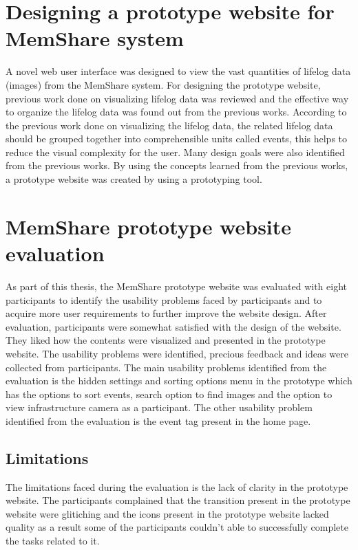 \documentclass[mscthesis]{usiinfthesis}
\begin{document}
\section{Designing a prototype website for MemShare system}
A novel web user interface was designed to view the vast quantities of lifelog data (images) from the MemShare system. For designing the prototype website, previous work done on visualizing lifelog data was reviewed and the effective way to organize the lifelog data was found out from the previous works. According to the previous work done on visualizing the lifelog data, the related lifelog data should be grouped together into comprehensible units called events, this helps to reduce the visual complexity for the user. Many design goals were also identified from the previous works. By using the concepts learned from the previous works, a prototype website was created by using a prototyping tool. 

\section{MemShare prototype website evaluation}
As part of this thesis, the MemShare prototype website was evaluated with eight participants to identify the usability problems faced by participants and to acquire more user requirements to further improve the website design. After evaluation, participants were somewhat satisfied with the design of the website. They liked how the contents were visualized and presented in the prototype website. The usability problems were identified, precious feedback and ideas were collected from participants. The main usability problems identified from the evaluation is the hidden settings and sorting options menu in the prototype which has the options to sort events, search option to find images and the option to view infrastructure camera as a participant. The other usability problem identified from the evaluation is the event tag present in the home page. 

\subsection{Limitations}
The limitations faced during the evaluation is the lack of clarity in the prototype website. The participants complained that the transition present in the prototype website were glitiching and the icons present in the prototype website lacked quality as a result some of the participants couldn’t able to successfully complete the tasks related to it. 
\end{document}
